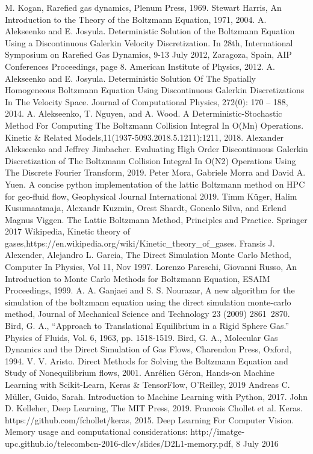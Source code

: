 \documentclass{article}
\begin{document}
\pagebreak
\begin{thebibliography}{99}
	M. Kogan, Rarefied gas dynamics, Plenum Press, 1969.
	Stewart Harris, An Introduction to the Theory of the Boltzmann Equation, 1971, 2004.
	A. Alekseenko and E. Josyula.  Deterministic Solution of the Boltzmann Equation Using a Discontinuous Galerkin Velocity Discretization. In 28th, International Symposium on Rarefied Gas Dynamics, 9-13 July 2012, Zaragoza, Spain, AIP Conferences Proceedings, page 8. American Institute of Physics, 2012.
	A. Alekseenko and E. Josyula.  Deterministic Solution Of The Spatially Homogeneous Boltzmann Equation Using Discontinuous Galerkin Discretizations In The Velocity Space. Journal of Computational Physics, 272(0): 170 – 188, 2014.
	A. Alekseenko, T. Nguyen, and A. Wood. A Deterministic-Stochastic Method For Computing The Boltzmann Collision Integral In O(Mn) Operations. Kinetic \& Related Models,11(1937-5093.2018.5.1211):1211, 2018.
	Alexander Alekseenko and Jeffrey Jimbacher. Evaluating High Order Discontinuous Galerkin Discretization of The Boltzmann Collision Integral In O(N2) Operations Using The Discrete Fourier Transform, 2019.
	 Peter Mora, Gabriele Morra and David A. Yuen. A concise python implementation of the lattic Boltzmann method on HPC for geo-fluid flow, Geophysical Journal International 2019.
	 Timm K\"{u}ger, Halim Kusumaatmaja, Alexandr Kuzmin, Orest Shardt, Goncalo Silva, and Erlend Magnus Viggen. The Lattic Boltzmann Method, Principles and Practice. Springer 2017
	Wikipedia, Kinetic theory of gases,https://en.wikipedia.org/wiki/Kinetic\_theory\_of\_gases.
	Fransis J. Alexender, Alejandro L. Garcia, The Direct Simulation Monte Carlo Method, Computer In Physics, Vol 11, Nov 1997.
	Lorenzo Pareschi, Giovanni Russo, An Introduction to Monte Carlo Methods for Boltzmann Equation, ESAIM Proceedings, 1999.
	A. A. Ganjaei and S. S. Nourazar, A new algorithm for the simulation of the boltzmann equation using the direct simulation monte-carlo method, Journal of Mechanical Science and Technology 23 (2009) 2861~2870.
	Bird, G. A., “Approach to Translational Equilibrium in a Rigid Sphere Gas.” Physics of Fluids, Vol. 6, 1963, pp. 1518-1519.
	Bird, G. A., Molecular Gas Dynamics and the Direct Simulation of Gas Flows, Charendon Press, Oxford, 1994.
	 V. V. Aristo. Direct Methods for Solving the Boltzmann Equation and Study of Nonequilibrium flows, 2001.
	Anr\'{e}lien G\'{e}ron, Hands-on Machine Learning with Scikit-Learn, Keras \& TensorFlow, O'Reilley, 2019
	Andreas C. Müller, Guido, Sarah. Introduction to Machine Learning with Python, 2017.
	John D. Kelleher, Deep Learning, The MIT Press, 2019.
	Francois Chollet et al. Keras. https://github.com/fchollet/keras, 2015.
	Deep Learning For Computer Vision. Memory usage and computational considerations: http://imatge-upc.github.io/telecombcn-2016-dlcv/slides/D2L1-memory.pdf, 8 July 2016  
\end{thebibliography}
\end{document}

